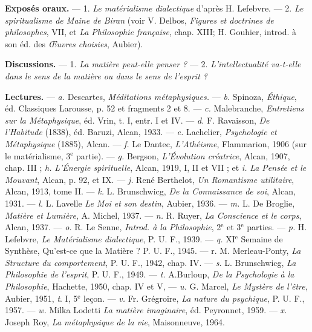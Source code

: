 {\bf Exposés oraux.} — 1. {\it Le matérialisme dialectique} d'après H. Lefebvre.
— 2. {\it Le spiritualisme de Maine de Biran} (voir V. Delbos, {\it Figures et doctrines
de philosophes}, VII, et {\it La Philosophie française}, chap. XIII; H. Gouhier,
introd. à son éd. des {\it Œuvres choisies}, Aubier).

{\bf Discussions.} — 1. {\it La matière peut-elle penser ?} — 2. {\it L'intellectualité
va-t-elle dans le sens de la matière ou dans le sens de l'esprit ?}

{\bf Lectures.} — {\it a.} Descartes, {\it Méditations métaphysiques.} — {\it b.} Spinoza,
{\it Éthique}, éd. Classiques Larousse, p. 52 et fragments 2 et 8. — {\it c.} Malebranche,
{\it Entretiens sur la Métaphysique}, éd. Vrin, t. I, entr. I et IV.
— {\it d.} F. Ravaisson, {\it De l'Habitude} (1838), éd. Baruzi, Alcan, 1933. —
{\it e.} Lachelier, {\it Psychologie et Métaphysique} (1885), Alcan. — {\it f.} Le Dantec,
{\it L'Athéisme}, Flammarion, 1906 (sur le matérialisme, 3$^\text{e}$ partie). — {\it g.} Bergson,
{\it L'Évolution créatrice}, Alcan, 1907, chap. III ; {\it h.} {\it L'Énergie spirituelle},
Alcan, 1919, I, II et VII ; et {\it i.} {\it La Pensée et le Mouvant}, Alcan, p. 92, et IX.
— {\it j.} René Berthelot, {\it Un Romantisme utilitaire}, Alcan, 1913, tome II. —
{\it k.} L. Brunschwicg, {\it De la Connaissance de soi}, Alcan, 1931. — {\it l.} L. Lavelle
{\it Le Moi et son destin}, Aubier, 1936. — {\it m.} L. De Broglie, {\it Matière et
Lumière}, A. Michel, 1937. — {\it n.} R. Ruyer, {\it La Conscience et le corps}, Alcan,
1937. — {\it o.} R. Le Senne, {\it Introd. à la Philosophie}, 2$^\text{e}$ et 3$^\text{e}$ parties. —
{\it p.} H. Lefebvre, {\it Le Matérialisme dialectique}, P. U. F., 1939. — {\it q.} XI$^\text{e}$
Semaine de Synthèse, {\it }Qu'est-ce que la Matière ? P. U. F., 1945. — {\it }r. M. Merleau-Ponty,
{\it La Structure du comportement}, P. U. F., 1942, chap. IV. —
{\it s.} L. Brunschwicg, {\it La Philosophie de l'esprit}, P. U. F., 1949. — {\it t.} A.Burloup,
{\it De la Psychologie à la Philosophie}, Hachette, 1950, chap. IV et V,
— {\it u.} G. Marcel, {\it Le Mystère de l'être}, Aubier, 1951, {\it t}. I, 5$^\text{e}$ leçon. —
{\it v.} Fr. Grégroire, {\it La nature du psychique}, P. U. F., 1957. — {\it w.} Milka Lodetti
{\it La matière imaginaire}, éd. Peyronnet, 1959. — {\it x.} Joseph Roy, {\it La métaphysique
de la vie}, Maisonneuve, 1964.

